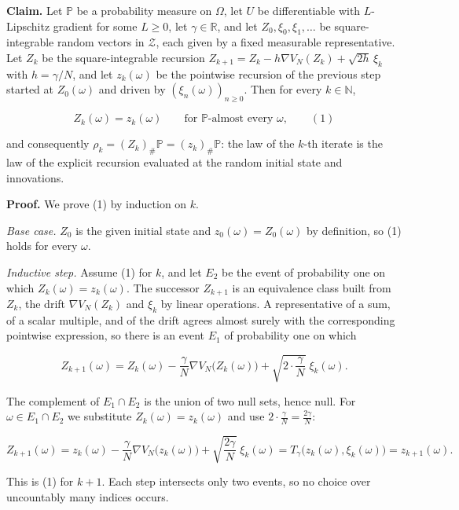 \documentclass[11pt,a4paper]{article}
\begin{document}
\textbf{Claim.} Let \(\mathbb P\) be a probability measure on \(\Omega\), let \(U\) be differentiable with \(L\)-Lipschitz gradient for some \(L\ge0\), let \(\gamma\in\mathbb R\), and let \(Z_0,\xi_0,\xi_1,\dots\) be square-integrable random vectors in \(\mathcal Z\), each given by a fixed measurable representative. Let \(Z_k\) be the square-integrable recursion \(Z_{k+1}=Z_k-h\nabla V_N(Z_k)+\sqrt{2h}\,\xi_k\) with \(h=\gamma/N\), and let \(z_k(\omega)\) be the pointwise recursion of the previous step started at \(Z_0(\omega)\) and driven by \((\xi_n(\omega))_{n\ge0}\). Then for every \(k\in\mathbb N\),


\[Z_k(\omega)=z_k(\omega)\qquad\text{for }\mathbb P\text{-almost every }\omega,\qquad(1)\]


and consequently \(\rho_k=(Z_k)_\#\mathbb P=(z_k)_\#\mathbb P\): the law of the \(k\)-th iterate is the law of the explicit recursion evaluated at the random initial state and innovations.




\textbf{Proof.} We prove (1) by induction on \(k\).




\emph{Base case.} \(Z_0\) is the given initial state and \(z_0(\omega)=Z_0(\omega)\) by definition, so (1) holds for every \(\omega\).




\emph{Inductive step.} Assume (1) for \(k\), and let \(E_2\) be the event of probability one on which \(Z_k(\omega)=z_k(\omega)\). The successor \(Z_{k+1}\) is an equivalence class built from \(Z_k\), the drift \(\nabla V_N(Z_k)\) and \(\xi_k\) by linear operations. A representative of a sum, of a scalar multiple, and of the drift agrees almost surely with the corresponding pointwise expression, so there is an event \(E_1\) of probability one on which


\[Z_{k+1}(\omega)=Z_k(\omega)-\frac\gamma N\nabla V_N\bigl(Z_k(\omega)\bigr)+\sqrt{2\cdot\frac\gamma N}\;\xi_k(\omega).\]


The complement of \(E_1\cap E_2\) is the union of two null sets, hence null. For \(\omega\in E_1\cap E_2\) we substitute \(Z_k(\omega)=z_k(\omega)\) and use \(2\cdot\frac\gamma N=\frac{2\gamma}N\):


\[Z_{k+1}(\omega)=z_k(\omega)-\frac\gamma N\nabla V_N\bigl(z_k(\omega)\bigr)+\sqrt{\frac{2\gamma}N}\;\xi_k(\omega)=T_\gamma\bigl(z_k(\omega),\xi_k(\omega)\bigr)=z_{k+1}(\omega).\]


This is (1) for \(k+1\). Each step intersects only two events, so no choice over uncountably many indices occurs.
\end{document}
